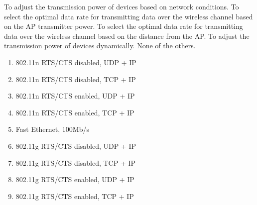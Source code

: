 

\begin{checkboxes}
    \choice To adjust the transmission power of devices based on network conditions.
    \choice To select the optimal data rate for transmitting data over the wireless channel based on the AP transmitter power.
    \choice To select the optimal data rate for transmitting data over the wireless channel based on the distance from the AP.
    \choice To adjust the transmission power of devices dynamically.
    \CorrectChoice None of the others.
\end{checkboxes}

\begin{solution}
    \begin{enumerate}
        \item 802.11n RTS/CTS disabled, UDP + IP
        \item 802.11n RTS/CTS disabled, TCP + IP
        \item 802.11n RTS/CTS enabled, UDP + IP
        \item 802.11n RTS/CTS enabled, TCP + IP
        \item Fast Ethernet, 100Mb/s
        \item 802.11g RTS/CTS disabled, UDP + IP
        \item 802.11g RTS/CTS disabled, TCP + IP
        \item 802.11g RTS/CTS enabled, UDP + IP
        \item 802.11g RTS/CTS enabled, TCP + IP
    \end{enumerate}
\end{solution}


